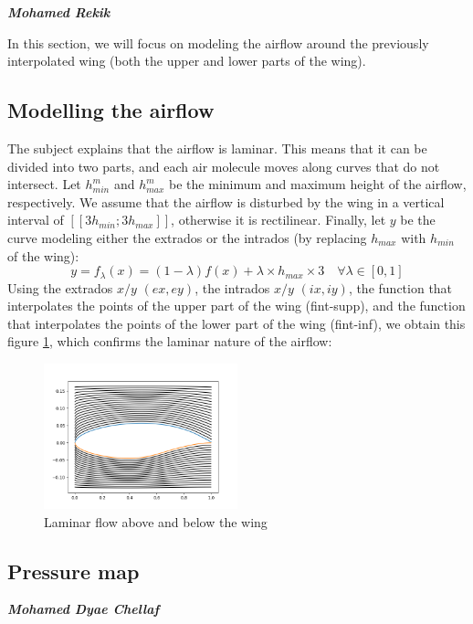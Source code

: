 \large \emph{\textbf{Mohamed Rekik}}

In this section, we will focus on modeling the airflow around the previously interpolated wing (both the upper and lower parts of the wing).
\subsection{Modelling the airflow}
The subject explains that the airflow is laminar. This means that it can be divided into two parts, and each air molecule moves along curves that do not intersect. Let $h_{min}^{m}$ and $h_{max}^{m}$ be the minimum and maximum height of the airflow, respectively. We assume that the airflow is disturbed by the wing in a vertical interval of $[[3h_{min}; 3h_{max}]]$, otherwise it is rectilinear. Finally, let $y$ be the curve modeling either the extrados or the intrados (by replacing $h_{max}$ with $h_{min}$ of the wing):
\begin{equation}
    \label{eq:equation_part3.1}
    y = f_{\lambda}(x) = (1 - \lambda)f(x) + \lambda \times h_{max} \times 3 \quad \forall \lambda \in [0,1] 
\end{equation}
Using the extrados $x/y$ $(ex, ey)$, the intrados $x/y$ $(ix, iy)$, the function that interpolates the points of the upper part of the wing (fint-supp), and the function that interpolates the points of the lower part of the wing (fint-inf), we obtain this figure \ref{fig:laminar}, which confirms the laminar nature of the airflow:
\begin{figure}[H]
  \centering
  \includegraphics[width=0.5\textwidth]{img/laminar_flow.png}
  \caption{Laminar flow above and below the wing}
  \label{fig:laminar}
\end{figure}
\subsection{Pressure map}

\large \emph{\textbf{Mohamed Dyae Chellaf}}

